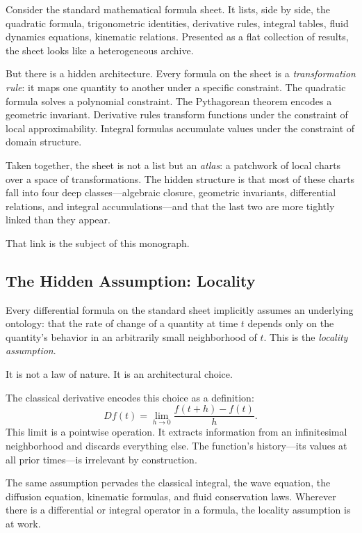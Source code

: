 \documentclass[12pt]{article}
\begin{document}
Consider the standard mathematical formula sheet. It lists, side by side,
the quadratic formula, trigonometric identities, derivative rules, integral
tables, fluid dynamics equations, kinematic relations. Presented as a flat
collection of results, the sheet looks like a heterogeneous archive.

But there is a hidden architecture. Every formula on the sheet is a
\emph{transformation rule}: it maps one quantity to another under a specific
constraint. The quadratic formula solves a polynomial constraint. The
Pythagorean theorem encodes a geometric invariant. Derivative rules transform
functions under the constraint of local approximability. Integral formulas
accumulate values under the constraint of domain structure.

Taken together, the sheet is not a list but an \emph{atlas}: a patchwork of
local charts over a space of transformations. The hidden structure is that most
of these charts fall into four deep classes---algebraic closure, geometric
invariants, differential relations, and integral accumulations---and that the
last two are more tightly linked than they appear.

That link is the subject of this monograph.

\subsection{The Hidden Assumption: Locality}

Every differential formula on the standard sheet implicitly assumes an
underlying ontology: that the rate of change of a quantity at time $t$
depends only on the quantity's behavior in an arbitrarily small neighborhood
of $t$. This is the \emph{locality assumption}.

It is not a law of nature. It is an architectural choice.

The classical derivative encodes this choice as a definition:
\[
  Df(t) = \lim_{h \to 0} \frac{f(t+h) - f(t)}{h}.
\]
This limit is a pointwise operation. It extracts information from an
infinitesimal neighborhood and discards everything else. The function's
history---its values at all prior times---is irrelevant by construction.

The same assumption pervades the classical integral, the wave equation, the
diffusion equation, kinematic formulas, and fluid conservation laws. Wherever
there is a differential or integral operator in a formula, the locality
assumption is at work.
\end{document}
